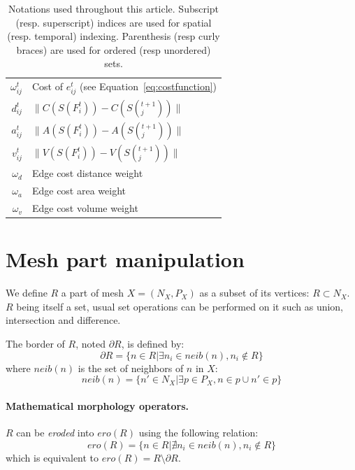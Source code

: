 \documentclass[review]{acmsiggraph}
\begin{document}
\begin{table}[htbp]
\begin{tabular}{ rl }
        $\omega^t_{ij}$     & Cost of $e^t_{ij}$ (see Equation~\ref{eq:costfunction}) \\
        $d^t_{ij}$          & $\|C(S(F^t_i)) - C(S(_j^{t+1}))\|$ \\
        $a^t_{ij}$          & $\|A(S(F^t_i)) - A(S(_j^{t+1}))\|$ \\
        $v^t_{ij}$          & $\|V(S(F^t_i)) - V(S(_j^{t+1}))\|$ \\
        $\omega_d$          & Edge cost distance weight \\
        $\omega_a$          & Edge cost area weight \\
        $\omega_v$          & Edge cost volume weight \\
        \hline
    \end{tabular}
\caption{Notations used throughout this article.
Subscript (resp. superscript) indices are used for spatial (resp. temporal) indexing.
Parenthesis (resp curly braces) are used for ordered (resp unordered) sets.}
\label{tab:notation}
\end{table}

\section{Mesh part manipulation}
\label{sec:mesh_part}

We define $R$ a part of mesh $X=(N_X, P_X)$ as a subset of its vertices: $R\subset N_X$.
$R$ being itself a set, usual set operations can be performed on it such as union, intersection and difference.

The border of $R$, noted $\partial R$, is defined by:
\begin{equation}
 \partial R = \{ n \in R \vert \exists n_i \in neib(n), n_i \not\in R \}
\end{equation}
where $neib(n)$ is the set of neighbors of $n$ in $X$:
\begin{equation}
 neib(n) = \{ n' \in N_X \vert \exists p \in P_X, n \in p \cup n' \in p \} 
\end{equation}

\paragraph{Mathematical morphology operators.}
$R$ can be \emph{eroded} into $ero(R)$ using the following relation:
\begin{equation}
 ero(R) = \{ n \in R \vert \nexists n_i \in neib(n), n_i \not\in R \}
\end{equation}
which is equivalent to $ero(R) = R \setminus \partial R$.
\end{document}
